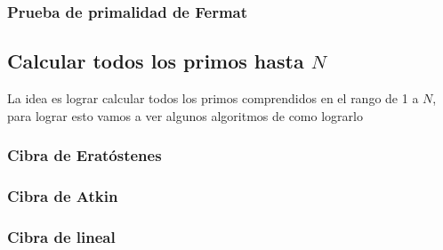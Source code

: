 \subsubsection{Prueba de primalidad de Fermat}


\subsection{Calcular todos los primos hasta $N$}
La idea es lograr calcular todos los primos comprendidos en el rango de 1 a $N$, para lograr esto vamos a ver algunos algoritmos de como lograrlo

\subsubsection{Cibra de Eratóstenes}


\subsubsection{Cibra de Atkin}


\subsubsection{Cibra de lineal}



